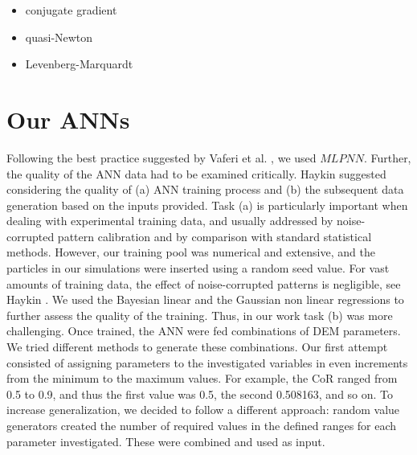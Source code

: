 \begin{itemize}
  \item{conjugate gradient }
  \item{quasi-Newton}
  \item{Levenberg-Marquardt}
\end{itemize}

\section{Our ANNs}
\label{sec:ouranns}


Following the best practice suggested by Vaferi et al. \cite{RefWorks:150}, we
used $MLPNN$.
Further, the quality of the \acs{ANN} data had to be examined critically. 
Haykin \cite{RefWorks:158} 
suggested considering the quality of (a) \acs{ANN} training process and (b) the
subsequent data generation based on the inputs provided.
Task (a) is particularly important
when dealing with experimental training data, and
usually addressed
by noise-corrupted pattern calibration
and by comparison with standard statistical methods.
However, our training pool was numerical and extensive, 
and the particles in our simulations were inserted using a random
seed value.
For vast amounts of training data, the effect of noise-corrupted patterns is
negligible, see Haykin \cite{RefWorks:158}.
We used the Bayesian linear and the Gaussian non linear regressions to further
assess the quality of the training.
Thus, in our work task (b) was more challenging.
Once trained, the \acs{ANN} were fed
combinations of \acs{DEM} parameters. 
We tried different methods to generate these combinations. 
Our first attempt consisted of assigning parameters to the investigated
variables in even increments from the minimum to the maximum values. 
For example, the \acs{CoR} ranged from 0.5 to 0.9, and thus the first value was
0.5, the second 0.508163, and so on.
To increase generalization, we decided to follow a different approach: 
random value generators created the number of required values in the defined
ranges for each parameter investigated.
These were combined and used as input.\\
